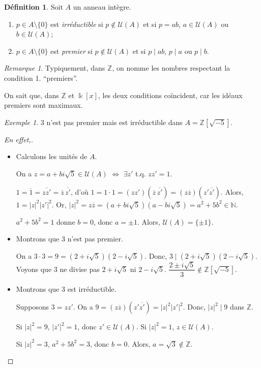 \documentclass{report}
\theoremstyle{definition}
\newtheorem*{dfn}{D\'efinition}
\theoremstyle{remark}
\newtheorem*{exem}{Exemple}
\newtheorem*{rmq}{Remarque}
\newenvironment*{subproof}[1][D\'emonstration]
{
\begin{proof}[#1]

}
{
\renewcommand{\qedsymbol}{$\blacksquare$}
\end{proof}
\renewcommand{\qedsymbol}{$\square$}
}
\def\NN{\mathbb{N}}
\def\ZZ{\mathbb{Z}}
\newcommand*{\abs}[1]{\left|#1\right|}
\begin{document}
	\begin{dfn}
		Soit $A$ un anneau int\`egre.
		\begin{enumerate}
			\item $p\in A\setminus\{0\}$ est \emph{irr\'eductible} si $p\notin\mathcal{U}(A)$ et si $p=ab$, $a\in\mathcal{U}(A)$ ou $b\in\mathcal{U}(A)$;
			\item $p\in A\setminus\{0\}$ est \emph{premier} si $p\notin\mathcal{U}(A)$ et si $p \mid ab$, $p \mid a$ ou $p \mid b$.
		\end{enumerate}
	\end{dfn}

	\begin{rmq}
		Typiquement, dans $\ZZ$, on nomme les nombres respectant la condition 1. ``premiers''.

		On sait que, dans $\ZZ$ et $\Bbbk[x]$, les deux conditions co\"incident, car les id\'eaux premiers sont maximaux.
	\end{rmq}

	\begin{exem}
		$3$ n'est pas premier mais est irr\'eductible dans $A=\ZZ[\sqrt{-5}]$.
		\begin{subproof}[En effet,]~

			\begin{itemize}
				\item Calculons les unit\'es de $A$.

				On a $z=a+bi\sqrt{5}\in\mathcal{U}(A)$ $\Longleftrightarrow$ $\exists z'$ t.q. $zz'=1$.

				$1=\overline1=\overline{zz'}=\overline{z}\,\overline{z'}$, d'o\`u $1=1 \cdot 1 = (zz') (\overline{z}\,\overline{z'}) = (z\overline{z}) (z'\overline{z'})$. Alors, $1=\abs{z}^2 \abs{z'}^2$. Or, $\abs{z}^2 = z\overline{z} = (a+bi\sqrt{5}) (a-bi\sqrt{5}) = a^2+5b^2\in\NN$.

				$a^2+5b^2=1$ donne $b=0$, donc $a=\pm1$. Alors, $\mathcal{U}(A)=\{\pm1\}$.
				\item Montrons que $3$ n'est pas premier.

				On a $3 \cdot 3 = 9 = (2+i\sqrt{5}) (2-i\sqrt{5})$. Donc, $3 \mid (2+i\sqrt{5}) (2-i\sqrt{5})$. Voyons que $3$ ne divise pas $2+i\sqrt{5}$ ni $2-i\sqrt{5}$. $\dfrac{2\pm i\sqrt{5}}{3} \notin \ZZ[\sqrt{-5}]$.
				\item Montrons que $3$ est irr\'eductible.

				Supposons $3=zz'$. On a $9 = (z\overline{z}) (z'\overline{z'}) = \abs{z}^2 \abs{z'}^2$. Donc, $\abs{z}^2 \mid 9$ dans $\ZZ$.

				Si $\abs{z}^2=9$, $\abs{z'}^2=1$, donc $z'\in\mathcal{U}(A)$. Si $\abs{z}^2=1$, $z\in\mathcal{U}(A)$.

				Si $\abs{z}^2=3$, $a^2+5b^2=3$, donc $b=0$. Alors, $a=\sqrt{3}\notin\ZZ$. \lightning
			\end{itemize}
		\end{subproof}
	\end{exem}
\end{document}
